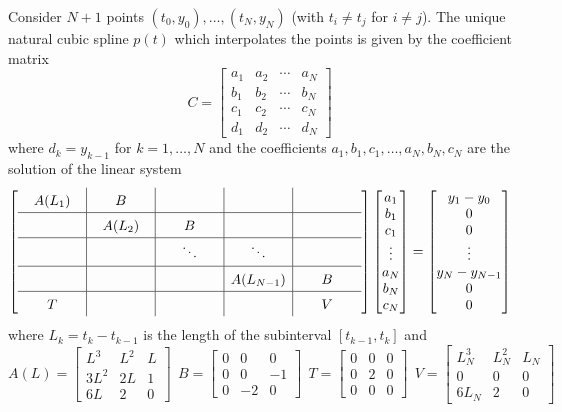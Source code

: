 \begin{proposition}
Consider $N+1$ points $(t_0,y_0),\dots,(t_N,y_N)$ (with $t_i \not= t_j$ for $i \not= j$). The unique natural cubic spline $p(t)$ which interpolates the points is given by the coefficient matrix
$$
C=
\begin{bmatrix}
a_1 & a_2 & \cdots & a_N \\
b_1 & b_2 & \cdots & b_N \\
c_1 & c_2 & \cdots & c_N \\
d_1 & d_2 & \cdots & d_N
\end{bmatrix}
$$
where $d_k = y_{k-1}$ for $k=1,\dots,N$ and the coefficients $a_1,b_1,c_1,\dots,a_N,b_N,c_N$ are the solution of the linear system
$$
\renewcommand{\arraystretch}{1.5}
\left[ \begin{array}{c|c|c|c|c}
A(L_1) & B & & & \\ \hline
& A(L_2) & B & & \\ \hline
& & \ddots & \ddots & \phantom{A(L_{N-1})} \\ \hline
\phantom{A(L_{N-1})} & \phantom{A(L_{N-1})} & \phantom{A(L_{N-1})} & A(L_{N-1}) & B \\ \hline
T & & & & V
\end{array} \right]
\renewcommand{\arraystretch}{1}
\begin{bmatrix} a_1 \\ b_1 \\ c_1 \\ \vdots \\ a_N \\ b_N \\ c_N \end{bmatrix}
=
\begin{bmatrix} y_1 - y_0 \\ 0 \\ 0 \\ \vdots \\ y_N - y_{N-1} \\ 0 \\ 0 \end{bmatrix}
$$
where $L_k = t_k - t_{k-1}$ is the length of the subinterval $[t_{k-1},t_k]$ and
$$
A(L) = \begin{bmatrix} L^3 & L^2 & L \\ 3L^2 & 2L & 1 \\ 6L & 2 & 0 \end{bmatrix}
\ \
B = \left[ \begin{array}{rrr} 0 & 0 & 0 \\ 0 & 0 & -1 \\ 0 & -2 & 0 \end{array} \right]
\ \
T = \begin{bmatrix} 0 & 0 & 0 \\ 0 & 2 & 0 \\ 0 & 0 & 0 \end{bmatrix}
\ \
V = \begin{bmatrix} L_N^3 & L_N^2 & L_N \\ 0 & 0 & 0 \\ 6L_N & 2 & 0 \end{bmatrix}
$$
\end{proposition}

